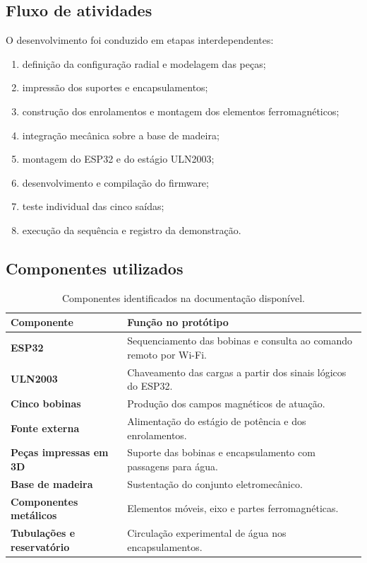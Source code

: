 \documentclass[12pt,a4paper,oneside]{article}
\begin{document}
\subsection{Fluxo de atividades}

O desenvolvimento foi conduzido em etapas interdependentes:
\begin{enumerate}[leftmargin=1.4cm]
  \item definição da configuração radial e modelagem das peças;
  \item impressão dos suportes e encapsulamentos;
  \item construção dos enrolamentos e montagem dos elementos ferromagnéticos;
  \item integração mecânica sobre a base de madeira;
  \item montagem do ESP32 e do estágio ULN2003;
  \item desenvolvimento e compilação do firmware;
  \item teste individual das cinco saídas;
  \item execução da sequência e registro da demonstração.
\end{enumerate}

\subsection{Componentes utilizados}

\begin{table}[H]
\centering
\caption{Componentes identificados na documentação disponível.}
\begin{tabularx}{\textwidth}{>{\bfseries}p{4.2cm}Y}
\toprule
Componente & Função no protótipo\\
\midrule
ESP32 & Sequenciamento das bobinas e consulta ao comando remoto por Wi-Fi.\\
ULN2003 & Chaveamento das cargas a partir dos sinais lógicos do ESP32.\\
Cinco bobinas & Produção dos campos magnéticos de atuação.\\
Fonte externa & Alimentação do estágio de potência e dos enrolamentos.\\
Peças impressas em 3D & Suporte das bobinas e encapsulamento com passagens para água.\\
Base de madeira & Sustentação do conjunto eletromecânico.\\
Componentes metálicos & Elementos móveis, eixo e partes ferromagnéticas.\\
Tubulações e reservatório & Circulação experimental de água nos encapsulamentos.\\
\bottomrule
\end{tabularx}
\end{table}
\end{document}
